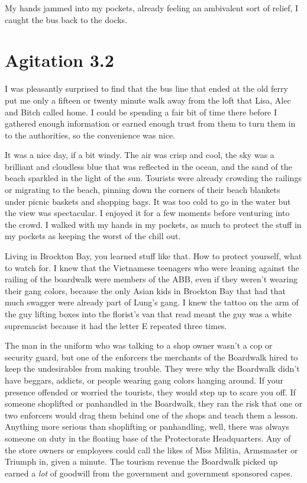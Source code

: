 My hands jammed into my pockets, already feeling an ambivalent sort of relief, I caught the bus back to the docks.


\chapter{Agitation 3.2}

I was pleasantly surprised to find that the bus line that ended at the old ferry put me only a fifteen or twenty minute walk away from the loft that Lisa, Alec and Bitch called home. I could be spending a fair bit of time there before I gathered enough information or earned enough trust from them to turn them in to the authorities, so the convenience was nice.

It was a nice day, if a bit windy. The air was crisp and cool, the sky was a brilliant and cloudless blue that was reflected in the ocean, and the sand of the beach sparkled in the light of the sun. Tourists were already crowding the railings or migrating to the beach, pinning down the corners of their beach blankets under picnic baskets and shopping bags. It was too cold to go in the water but the view was spectacular. I enjoyed it for a few moments before venturing into the crowd. I walked with my hands in my pockets, as much to protect the stuff in my pockets as keeping the worst of the chill out.

Living in Brockton Bay, you learned stuff like that. How to protect yourself, what to watch for. I knew that the Vietnamese teenagers who were leaning against the railing of the boardwalk were members of the ABB, even if they weren't wearing their gang colors, because the only Asian kids in Brockton Bay that had that much swagger were already part of Lung's gang. I knew the tattoo on the arm of the guy lifting boxes into the florist's van that read  meant the guy was a white supremacist because it had the letter E repeated three times.

The man in the uniform who was talking to a shop owner wasn't a cop or security guard, but one of the enforcers the merchants of the Boardwalk hired to keep the undesirables from making trouble. They were why the Boardwalk didn't have beggars, addicts, or people wearing gang colors hanging around. If your presence offended or worried the tourists, they would step up to scare you off. If someone shoplifted or panhandled in the Boardwalk, they ran the risk that one or two enforcers would drag them behind one of the shops and teach them a lesson. Anything more serious than shoplifting or panhandling, well, there was always someone on duty in the floating base of the Protectorate Headquarters. Any of the store owners or employees could call the likes of Miss Militia, Armsmaster or Triumph in, given a minute. The tourism revenue the Boardwalk picked up earned a {\em lot} of goodwill from the government and government sponsored capes.

